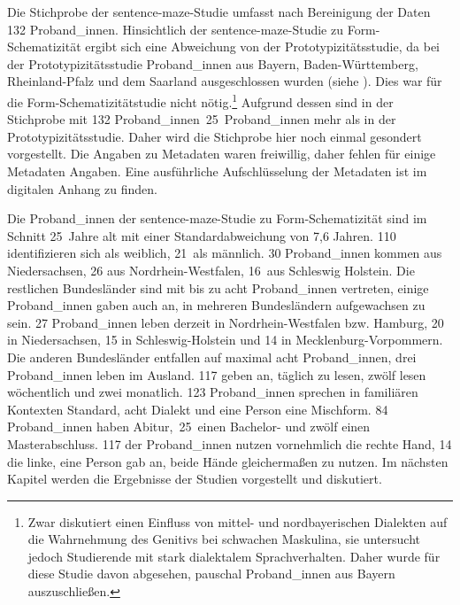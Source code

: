  

Die Stichprobe der sentence-maze-Studie umfasst nach Bereinigung der Daten 132 Proband\_innen. Hinsichtlich der sentence-maze-Studie zu Form-Sche\-ma\-ti\-zi\-tät ergibt sich eine Abweichung von der Prototypizitätsstudie, da bei der Prototypizitätsstudie Proband\_innen aus Bayern, Baden-Württemberg, Rheinland-Pfalz und dem Saarland ausgeschlossen wurden (siehe ). Dies war für die Form-Schematizitätstudie nicht nötig.\footnote{Zwar diskutiert \cite{RonnebergerSibold.2020} einen Einfluss von mittel- und nordbayerischen Dialekten auf die Wahrnehmung des Genitivs bei schwachen Maskulina, sie untersucht jedoch Studierende mit stark dialektalem Sprachverhalten. Daher wurde für diese Studie davon abgesehen, pauschal Proband\_innen aus Bayern auszuschließen.} Aufgrund dessen sind in der Stichprobe mit 132 Proband\_innen~25~Proband\_innen mehr als in der Prototypizitätsstudie. Daher wird die Stichprobe hier noch einmal gesondert vorgestellt. Die Angaben zu Metadaten waren freiwillig, daher fehlen für einige Metadaten Angaben. Eine ausführliche Aufschlüsselung der Metadaten ist im digitalen Anhang zu finden. 



Die Proband\_innen der sentence-maze-Studie zu Form-Schematizität sind im Schnitt 25~Jahre alt mit einer Standardabweichung von 7,6 Jahren. 110 identifizieren sich als weiblich, 21~als männlich. 30 Proband\_innen kommen aus Niedersachsen, 26 aus Nordrhein-Westfalen, 16~aus Schleswig Holstein. Die restlichen Bundesländer sind mit bis zu acht Proband\_innen vertreten, einige Proband\_innen gaben auch an, in mehreren Bundesländern aufgewachsen zu sein. 27 Pro\-\mbox{band\_in}\-nen leben derzeit in Nordrhein-Westfalen bzw. Hamburg, 20 in Niedersachsen, 15 in Schleswig-Holstein und 14 in Mecklen\-burg-Vorpommern. Die anderen Bundesländer entfallen auf maximal acht Proband\_innen, drei Pro\-\mbox{band\_in}\-nen leben im Ausland. 117 geben an, täglich zu lesen, zwölf lesen wöchentlich und zwei monatlich. 123 Proband\_innen sprechen in familiären Kontexten Standard, acht Dialekt und eine Person eine Mischform. 84 Proband\_innen haben Abitur,~25~einen Bachelor- und zwölf einen Masterabschluss. 117 der Proband\_innen nutzen vornehmlich die rechte Hand, 14 die linke, eine Person gab an, beide Hände gleichermaßen zu nutzen. Im nächsten Kapitel werden die Ergebnisse der Studien vorgestellt und diskutiert.

